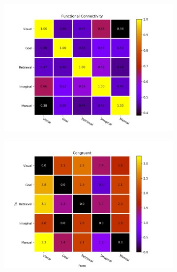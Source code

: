 \documentclass[10pt,letterpaper]{article}
\begin{document}
\begin{figure}[ht]
\centering
\begin{subfigure}{.5\textwidth}
  \centering
  \includegraphics[width=\linewidth]{func_conn.png}
  \caption{}
\end{subfigure}%
\begin{subfigure}{.5\textwidth}
  \centering
  \includegraphics[width=\linewidth]{Congruent_effect_conn.png}
  \caption{}
\end{subfigure}
\begin{subfigure}{.5\textwidth}
  \centering

\end{subfigure}
\end{figure}
\end{document}
